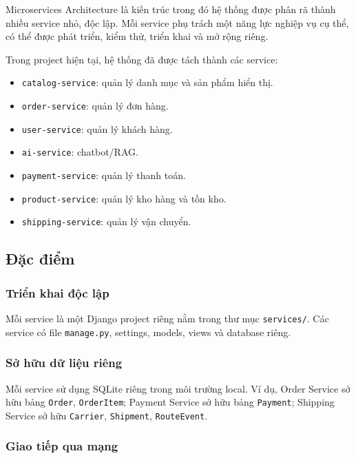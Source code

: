 \documentclass[12pt,a4paper]{report}
\begin{document}
Microservices Architecture là kiến trúc trong đó hệ thống được phân rã thành nhiều service nhỏ, độc lập. Mỗi service phụ trách một năng lực nghiệp vụ cụ thể, có thể được phát triển, kiểm thử, triển khai và mở rộng riêng.

Trong project hiện tại, hệ thống đã được tách thành các service:

\begin{itemize}
  \item \texttt{catalog-service}: quản lý danh mục và sản phẩm hiển thị.
  \item \texttt{order-service}: quản lý đơn hàng.
  \item \texttt{user-service}: quản lý khách hàng.
  \item \texttt{ai-service}: chatbot/RAG.
  \item \texttt{payment-service}: quản lý thanh toán.
  \item \texttt{product-service}: quản lý kho hàng và tồn kho.
  \item \texttt{shipping-service}: quản lý vận chuyển.
\end{itemize}

\subsection{Đặc điểm}

\subsubsection{Triển khai độc lập}

Mỗi service là một Django project riêng nằm trong thư mục \texttt{services/}. Các service có file \texttt{manage.py}, settings, models, views và database riêng.

\subsubsection{Sở hữu dữ liệu riêng}

Mỗi service sử dụng SQLite riêng trong môi trường local. Ví dụ, Order Service sở hữu bảng \texttt{Order}, \texttt{OrderItem}; Payment Service sở hữu bảng \texttt{Payment}; Shipping Service sở hữu \texttt{Carrier}, \texttt{Shipment}, \texttt{RouteEvent}.

\subsubsection{Giao tiếp qua mạng}
\end{document}
